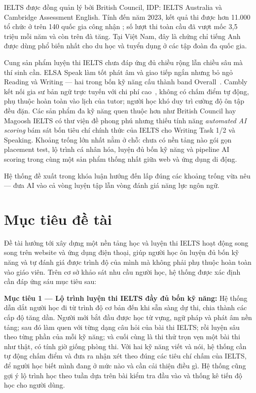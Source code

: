 IELTS được đồng quản lý bởi British Council, IDP: IELTS Australia và Cambridge Assessment English. Tính đến năm 2023, kết quả thi được hơn 11.000 tổ chức ở trên 140 quốc gia công nhận \cite{ielts-global-stats}; số lượt thi toàn cầu đã vượt mốc 3,5 triệu mỗi năm và còn trên đà tăng. Tại Việt Nam, đây là chứng chỉ tiếng Anh được dùng phổ biến nhất cho du học và tuyển dụng ở các tập đoàn đa quốc gia.

Cung sản phẩm luyện thi IELTS chưa đáp ứng đủ chiều rộng lẫn chiều sâu mà thí sinh cần. ELSA Speak làm tốt phát âm và giao tiếp ngắn nhưng bỏ ngỏ Reading và Writing --- hai trong bốn kỹ năng cấu thành band Overall~\cite{elsa-speak-pricing}. Cambly kết nối gia sư bản ngữ trực tuyến với chi phí cao~\cite{cambly-pricing}, không có chấm điểm tự động, phụ thuộc hoàn toàn vào lịch của tutor; người học khó duy trì cường độ ôn tập đều đặn. Các sản phẩm đa kỹ năng quen thuộc hơn như British Council hay Magoosh IELTS có thư viện đề phong phú nhưng thiếu tính năng \textit{automated AI scoring} bám sát bốn tiêu chí chính thức của IELTS cho Writing Task 1/2 và Speaking. Khoảng trống lớn nhất nằm ở chỗ: chưa có nền tảng nào gói gọn placement test, lộ trình cá nhân hóa, luyện đủ bốn kỹ năng và pipeline AI scoring trong cùng một sản phẩm thống nhất giữa web và ứng dụng di động.

Hệ thống đề xuất trong khóa luận hướng đến lấp đúng các khoảng trống vừa nêu --- đưa AI vào cả vòng luyện tập lẫn vòng đánh giá năng lực ngôn ngữ.

\section{Mục tiêu đề tài}

Đề tài hướng tới xây dựng một nền tảng học và luyện thi IELTS hoạt động song song trên website và ứng dụng điện thoại, giúp người học ôn luyện đủ bốn kỹ năng và tự đánh giá được trình độ của mình mà không phải phụ thuộc hoàn toàn vào giáo viên. Trên cơ sở khảo sát nhu cầu người học, hệ thống được xác định cần đáp ứng sáu mục tiêu sau:

\textbf{Mục tiêu 1 --- Lộ trình luyện thi IELTS đầy đủ bốn kỹ năng:} Hệ thống dẫn dắt người học đi từ trình độ cơ bản đến khi sẵn sàng dự thi, chia thành các cấp độ tăng dần. Người mới bắt đầu được học từ vựng, ngữ pháp và phát âm nền tảng; sau đó làm quen với từng dạng câu hỏi của bài thi IELTS; rồi luyện sâu theo từng phần của mỗi kỹ năng; và cuối cùng là thi thử trọn vẹn một bài thi như thật, có tính giờ giống phòng thi. Với hai kỹ năng viết và nói, hệ thống cần tự động chấm điểm và đưa ra nhận xét theo đúng các tiêu chí chấm của IELTS, để người học biết mình đang ở mức nào và cần cải thiện điều gì. Hệ thống cũng gợi ý lộ trình học theo tuần dựa trên bài kiểm tra đầu vào và thống kê tiến độ học cho người dùng.

